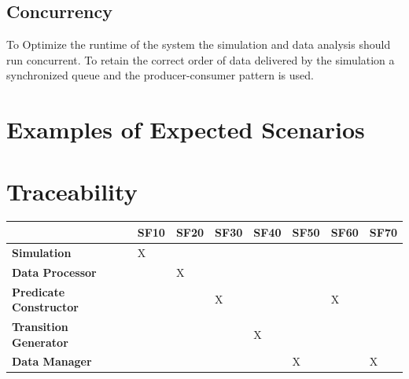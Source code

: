 \documentclass[a4paper, 11pt]{scrreprt}
\begin{document}
	\section{Concurrency}
		
		To Optimize the runtime of the system the simulation and data analysis should run concurrent.
		To retain the correct order of data delivered by the simulation a synchronized queue and the producer-consumer pattern is used.
		
	\chapter{Examples of Expected Scenarios}
		
	
	\chapter{Traceability}
		
		\begin{tabu}{|>{\bfseries}X[l,m]|X[-1,c,m]|X[-1,c,m]|X[-1,c,m]|X[-1,c,m]|X[-1,c,m]|X[c,-1,m]|X[c,-1,m]|}
			\hline
			\rowfont[l]{\bfseries} & SF10 & SF20 & SF30 & SF40 & SF50 & SF60 & SF70\\ \hline
			Simulation & X & & & & & & \\ \hline
			Data Processor & & X & & & & &\\ \hline
			Predicate Constructor & & & X & & & X &\\ \hline
			Transition Generator & & & & X & & & \\ \hline
			Data Manager & & & & & X & & X\\ \hline
		\end{tabu}
\end{document}
